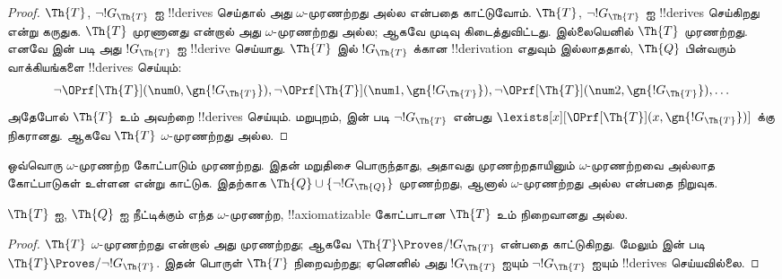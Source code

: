 \documentclass[../../../include/open-logic-section]{subfiles}
\begin{document}
\begin{proof}
$\Th{T}$, $\lnot !G_\Th{T}$ ஐ !!{derive}s செய்தால் அது
$\omega$-முரணற்றது அல்ல என்பதை காட்டுவோம். $\Th{T}$,
$\lnot !G_\Th{T}$ ஐ !!{derive}s செய்கிறது என்று கருதுக.
$\Th{T}$ முரணானது என்றால் அது $\omega$-முரணற்றது அல்ல; ஆகவே
முடிவு கிடைத்துவிட்டது. இல்லையெனில் $\Th{T}$ முரணற்றது. எனவே
 இன் படி அது $!G_\Th{T}$ ஐ !!{derive}
செய்யாது. $\Th{T}$ இல் $!G_\Th{T}$ க்கான !!{derivation} எதுவும்
இல்லாததால், $\Th{Q}$ பின்வரும் வாக்கியங்களை !!{derive}s செய்யும்:
\[
\lnot \OPrf[\Th{T}](\num 0, \gn{!G_\Th{T}}), \lnot \OPrf[\Th{T}](\num 1,
\gn{!G_\Th{T}}), \lnot \OPrf[\Th{T}](\num 2, \gn{!G_\Th{T}}), \dots
\]
அதேபோல் $\Th{T}$ உம் அவற்றை !!{derive}s செய்யும். மறுபுறம்,
 இன் படி $\lnot !G_\Th{T}$ என்பது
$\lexists[x][\OPrf[\Th{T}](x,\gn{!G_\Th{T}})]$ க்கு நிகரானது.
ஆகவே $\Th{T}$ $\omega$-முரணற்றது அல்ல.
\end{proof}

\begin{prob}
ஒவ்வொரு $\omega$-முரணற்ற கோட்பாடும் முரணற்றது. இதன் மறுதிசை
பொருந்தாது, அதாவது முரணற்றதாயினும் $\omega$-முரணற்றவை அல்லாத
கோட்பாடுகள் உள்ளன என்று காட்டுக. இதற்காக
$\Th{Q} \cup \{\lnot !G_\Th{Q}\}$ முரணற்றது, ஆனால்
$\omega$-முரணற்றது அல்ல என்பதை நிறுவுக.
\end{prob}

\begin{thm}
$\Th{T}$ ஐ, $\Th{Q}$ ஐ நீட்டிக்கும் எந்த $\omega$-முரணற்ற,
!!{axiomatizable} கோட்பாடான $\Th{T}$ உம் நிறைவானது அல்ல.
\end{thm}

\begin{proof}
$\Th{T}$ $\omega$-முரணற்றது என்றால் அது முரணற்றது; ஆகவே
$\Th{T} \Proves/ !G_\Th{T}$ என்பதை
 காட்டுகிறது. மேலும்
 இன் படி
$\Th{T} \Proves/ \lnot !G_\Th{T}$. இதன் பொருள் $\Th{T}$
நிறைவற்றது; ஏனெனில் அது $!G_\Th{T}$ ஐயும்
$\lnot !G_\Th{T}$ ஐயும் !!{derive}s செய்யவில்லை.
\end{proof}
\end{document}
